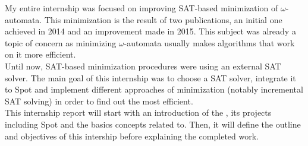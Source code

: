 My entire internship was focused on improving SAT-based minimization of $\omega$-automata. This minimization
is the result of two publications, an initial one achieved in 2014 and an improvement made in 2015.
This subject was already a topic of concern as minimizing $\omega$-automata usually makes algorithms that
work on it more efficient.\\

Until now, SAT-based minimization procedures were using an external SAT solver. The main goal of this
internship was to choose a SAT solver, integrate it to Spot and implement different approaches of
minimization (notably incremental SAT solving) in order to find out the most efficient.\\

This internship report will start with an introduction of the \LRDE\space, its projects including Spot and
the basics concepts related to. Then, it will define the outline and objectives of this intership before
explaining the completed work.
